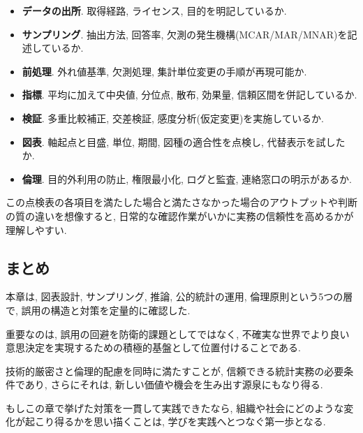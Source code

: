 \begin{itemize}
  \item \textbf{データの出所}. 取得経路, ライセンス, 目的を明記しているか.
  \item \textbf{サンプリング}. 抽出方法, 回答率, 欠測の発生機構(MCAR/MAR/MNAR)を記述しているか.
  \item \textbf{前処理}. 外れ値基準, 欠測処理, 集計単位変更の手順が再現可能か.
  \item \textbf{指標}. 平均に加えて中央値, 分位点, 散布, 効果量, 信頼区間を併記しているか.
  \item \textbf{検証}. 多重比較補正, 交差検証, 感度分析(仮定変更)を実施しているか.
  \item \textbf{図表}. 軸起点と目盛, 単位, 期間, 図種の適合性を点検し, 代替表示を試したか.
  \item \textbf{倫理}. 目的外利用の防止, 権限最小化, ログと監査, 連絡窓口の明示があるか.
\end{itemize}

この点検表の各項目を満たした場合と満たさなかった場合のアウトプットや判断の質の違いを想像すると, 日常的な確認作業がいかに実務の信頼性を高めるかが理解しやすい.

\subsection{まとめ}

本章は, 図表設計, サンプリング, 推論, 公的統計の運用, 倫理原則という5つの層で, 誤用の構造と対策を定量的に確認した.  

重要なのは, 誤用の回避を防衛的課題としてではなく, 不確実な世界でより良い意思決定を実現するための積極的基盤として位置付けることである.  

技術的厳密さと倫理的配慮を同時に満たすことが, 信頼できる統計実務の必要条件であり, さらにそれは, 新しい価値や機会を生み出す源泉にもなり得る.  

もしこの章で挙げた対策を一貫して実践できたなら, 組織や社会にどのような変化が起こり得るかを思い描くことは, 学びを実践へとつなぐ第一歩となる.
